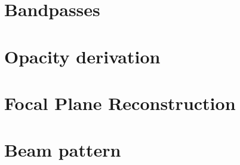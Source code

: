 \documentclass[a4paper, 11pt]{article} %
\begin{document}
\section{Bandpasses}
\label{se:bandpasses}


\clearpage
\section{Opacity derivation}
\label{se:opacities}




\clearpage
\section{Focal Plane Reconstruction}
\label{se:fp_reconstruction}




\clearpage


\clearpage
\section{Beam pattern}
\label{se:beams}



\clearpage
\end{document}

